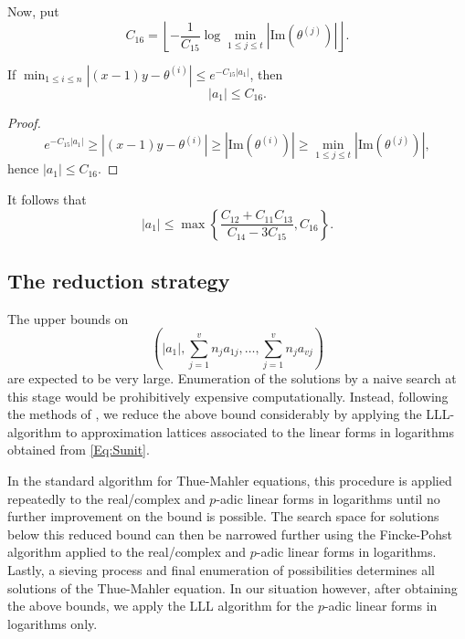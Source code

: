 
Now, put 
$$
C_{16} = \left\lfloor{-\frac{1}{C_{15}} \log \min_{1 \leq j \leq t} |\text{Im} (\theta^{(j)})|}\right\rfloor.
$$
\begin{lemma}
If $\displaystyle \min_{1\leq i\leq n}|(x-1)y-\theta^{(i)}| \leq e^{-C_{15}|a_1|}$, then 
\[|a_1| \leq C_{16}.\]
\end{lemma}

\begin{proof}
\[e^{-C_{15}|a_1|} \geq |(x-1)y-\theta^{(i)}| \geq |\text{Im}(\theta^{(i)})| \geq \min_{1 \leq j \leq t} |\text{Im} (\theta^{(j)})|,\]
hence $|a_1| \leq C_{16}$.
\end{proof}

It follows that 
\[|a_1| \leq \max\left\{\frac{C_{12} + C_{11}C_{13}}{C_{14} - 3C_{15}}, C_{16}\right\}.\] 

\subsection{The reduction strategy} 

The upper bounds on 
\[\left(|a_1|, \sum_{j = 1}^v n_ja_{1j}, \dots, \sum_{j = 1}^v n_ja_{vj}\right)\]
are expected to be very large. Enumeration of the solutions by a naive search at this stage would be prohibitively expensive computationally. Instead, following the methods of \cite{TW3}, we reduce the above bound considerably by applying the LLL-algorithm to approximation lattices associated to the linear forms in logarithms obtained from \eqref{Eq:Sunit}. 

In the standard algorithm for Thue-Mahler equations, this procedure is applied repeatedly to the real/complex and $p$-adic linear forms in logarithms until no further improvement on the bound is possible. The search space for solutions below this reduced bound can then be narrowed further using the Fincke-Pohst algorithm applied to the real/complex and $p$-adic linear forms in logarithms. Lastly, a sieving process and final enumeration of possibilities determines all solutions of the Thue-Mahler equation. In our situation however, after obtaining the above bounds, we apply the LLL algorithm for the $p$-adic linear forms in logarithms only. 

